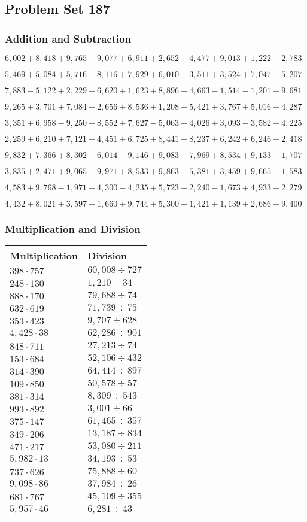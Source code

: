 \hypertarget{problem-set-187}{%
\subsection{Problem Set 187}\label{problem-set-187}}

\hypertarget{addition-and-subtraction}{%
\subsubsection{Addition and
Subtraction}\label{addition-and-subtraction}}

\(6,002+8,418+9,765+9,077+6,911+2,652+4,477+9,013+1,222+2,783\)

\(5,469+5,084+5,716+8,116+7,929+6,010+3,511+3,524+7,047+5,207\)

\(7,883-5,122+2,229+6,620+1,623+8,896+4,663-1,514-1,201-9,681\)

\(9,265+3,701+7,084+2,656+8,536+1,208+5,421+3,767+5,016+4,287\)

\(3,351+6,958-9,250+8,552+7,627-5,063+4,026+3,093-3,582-4,225\)

\(2,259+6,210+7,121+4,451+6,725+8,441+8,237+6,242+6,246+2,418\)

\(9,832+7,366+8,302-6,014-9,146+9,083-7,969+8,534+9,133-1,707\)

\(3,835+2,471+9,065+9,971+8,533+9,863+5,381+3,459+9,665+1,583\)

\(4,583+9,768-1,971-4,300-4,235+5,723+2,240-1,673+4,933+2,279\)

\(4,432+8,021+3,597+1,660+9,744+5,300+1,421+1,139+2,686+9,400\)

\hypertarget{multiplication-and-division}{%
\subsubsection{Multiplication and
Division}\label{multiplication-and-division}}

\begin{longtable}[]{@{}ll@{}}
\toprule
Multiplication & Division\tabularnewline
\midrule
\endhead
\(398\cdot757\) & \(60,008÷727\)\tabularnewline
\(248\cdot130\) & \(1,210-34\)\tabularnewline
\(888\cdot170\) & \(79,688÷74\)\tabularnewline
\(632\cdot619\) & \(71,739÷75\)\tabularnewline
\(353\cdot423\) & \(9,707÷628\)\tabularnewline
\(4,428\cdot38\) & \(62,286÷901\)\tabularnewline
\(848\cdot711\) & \(27,213÷74\)\tabularnewline
\(153\cdot684\) & \(52,106÷432\)\tabularnewline
\(314\cdot390\) & \(64,414÷897\)\tabularnewline
\(109\cdot850\) & \(50,578÷57\)\tabularnewline
\(381\cdot314\) & \(8,309÷543\)\tabularnewline
\(993\cdot892\) & \(3,001÷66\)\tabularnewline
\(375\cdot147\) & \(61,465÷357\)\tabularnewline
\(349\cdot206\) & \(13,187÷834\)\tabularnewline
\(471\cdot217\) & \(53,080÷211\)\tabularnewline
\(5,982\cdot13\) & \(34,193÷53\)\tabularnewline
\(737\cdot626\) & \(75,888÷60\)\tabularnewline
\(9,098\cdot86\) & \(37,984÷26\)\tabularnewline
\(681\cdot767\) & \(45,109÷355\)\tabularnewline
\(5,957\cdot46\) & \(6,281÷43\)\tabularnewline
\bottomrule
\end{longtable}
